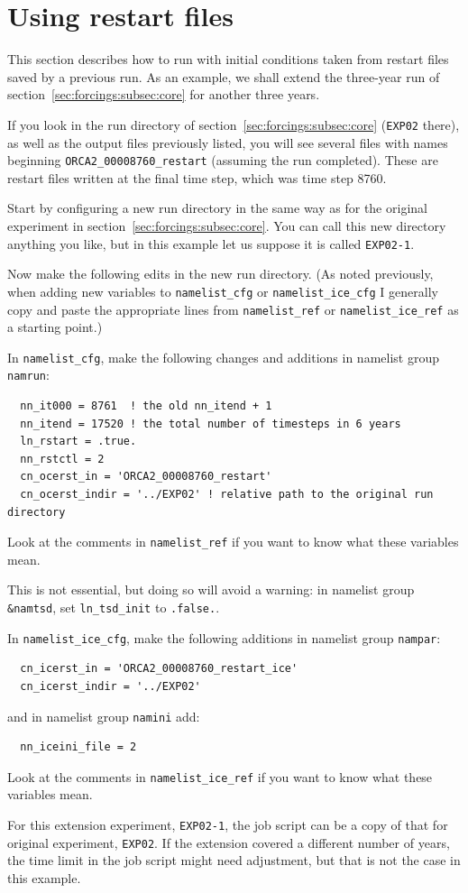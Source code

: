 \section{Using restart files}
\label{sec:restarts}

This section describes how to run \NEMOSIcu{} with initial conditions taken from restart files saved by a previous run.
As an example, we shall extend the three-year run of section~\ref{sec:forcings:subsec:core} for another three years.

If you look in the run directory of section~\ref{sec:forcings:subsec:core} (\verb|EXP02| there), as well as the output files previously listed, you will see several files with names beginning \verb|ORCA2_00008760_restart| (assuming the run completed).
These are restart files written at the final time step, which was time step 8760.

Start by configuring a new run directory in the same way as for the original experiment in section~\ref{sec:forcings:subsec:core}.
You can call this new directory anything you like, but in this example let us suppose it is called \verb|EXP02-1|.

Now make the following edits in the new run directory.
(As noted previously, when adding new variables to \verb|namelist_cfg| or \verb|namelist_ice_cfg| I generally copy and paste the appropriate lines from \verb|namelist_ref| or \verb|namelist_ice_ref| as a starting point.)

In \verb|namelist_cfg|, make the following changes and additions in namelist group \verb|namrun|:

\begin{verbatim}
  nn_it000 = 8761  ! the old nn_itend + 1
  nn_itend = 17520 ! the total number of timesteps in 6 years
  ln_rstart = .true.
  nn_rstctl = 2
  cn_ocerst_in = 'ORCA2_00008760_restart'
  cn_ocerst_indir = '../EXP02' ! relative path to the original run directory
\end{verbatim}

Look at the comments in \verb|namelist_ref| if you want to know what these variables mean.

This is not essential, but doing so will avoid a warning: in namelist group \verb|&namtsd|, set \verb|ln_tsd_init| to \verb|.false.|.

In \verb|namelist_ice_cfg|, make the following additions in namelist group \verb|nampar|:

\begin{verbatim}
  cn_icerst_in = 'ORCA2_00008760_restart_ice'
  cn_icerst_indir = '../EXP02'
\end{verbatim}

and in namelist group \verb|namini| add:

\begin{verbatim}
  nn_iceini_file = 2
\end{verbatim}

Look at the comments in \verb|namelist_ice_ref| if you want to know what these variables mean.

For this extension experiment, \verb|EXP02-1|, the job script can be a copy of that for original experiment, \verb|EXP02|.
If the extension covered a different number of years, the time limit in the job script might need adjustment, but that is not the case in this example.
